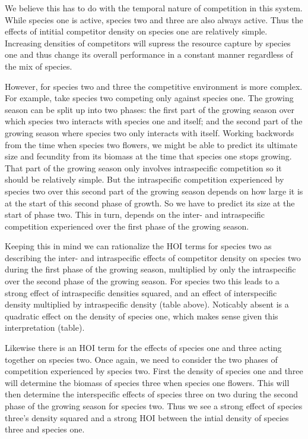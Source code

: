 \documentclass[12pt,]{article}
\begin{document}
We believe this has to do with the temporal nature of competition in
this system. While species one is active, species two and three are also
always active. Thus the effects of intitial competitor density on
species one are relatively simple. Increasing densities of competitors
will supress the resource capture by species one and thus change its
overall performance in a constant manner regardless of the mix of
species.

However, for species two and three the competitive environment is more
complex. For example, take species two competing only against species
one. The growing season can be split up into two phases: the first part
of the growing season over which species two interacts with species one
and itself; and the second part of the growing season where species two
only interacts with itself. Working backwords from the time when species
two flowers, we might be able to predict its ultimate size and fecundity
from its biomass at the time that species one stops growing. That part
of the growing season only involves intraspecific competition so it
should be relatively simple. But the intraspecific competition
experienced by species two over this second part of the growing season
depends on how large it is at the start of this second phase of growth.
So we have to predict its size at the start of phase two. This in turn,
depends on the inter- and intraspecific competition experienced over the
first phase of the growing season.

Keeping this in mind we can rationalize the HOI terms for species two as
describing the inter- and intraspecific effects of competitor density on
species two during the first phase of the growing season, multiplied by
only the intraspecific over the second phase of the growing season. For
species two this leads to a strong effect of intraspecific densities
squared, and an effect of interspecific density multiplied by
intraspecific density (table above). Noticably absent is a quadratic
effect on the density of species one, which makes sense given this
interpretation (table).

Likewise there is an HOI term for the effects of species one and three
acting together on species two. Once again, we need to consider the two
phases of competition experienced by species two. First the density of
species one and three will determine the biomass of species three when
species one flowers. This will then determine the interspecific effects
of species three on two during the second phase of the growing season
for species two. Thus we see a strong effect of species three's density
squared and a strong HOI between the intial density of species three and
species one.
\end{document}
